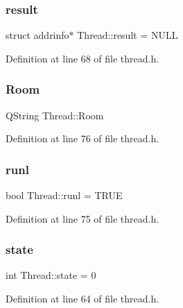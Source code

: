 \subsubsection{\texorpdfstring{result}{result}}
{\footnotesize\ttfamily struct addrinfo$\ast$ Thread\+::result = N\+U\+LL\hspace{0.3cm}{\ttfamily [private]}}



Definition at line 68 of file thread.\+h.

\mbox{\label{class_thread_a2deb54a8426f7deccbe806abb1134768}} 
\subsubsection{\texorpdfstring{Room}{Room}}
{\footnotesize\ttfamily Q\+String Thread\+::\+Room\hspace{0.3cm}{\ttfamily [private]}}



Definition at line 76 of file thread.\+h.

\mbox{\label{class_thread_ab516b75aa819bfec85f8cf0af28f7ddc}} 
\subsubsection{\texorpdfstring{runl}{runl}}
{\footnotesize\ttfamily bool Thread\+::runl = T\+R\+UE\hspace{0.3cm}{\ttfamily [private]}}



Definition at line 75 of file thread.\+h.

\mbox{\label{class_thread_a0715eab05808859fe29d0f2915ee9899}} 
\subsubsection{\texorpdfstring{state}{state}}
{\footnotesize\ttfamily int Thread\+::state = 0\hspace{0.3cm}{\ttfamily [private]}}



Definition at line 64 of file thread.\+h.

